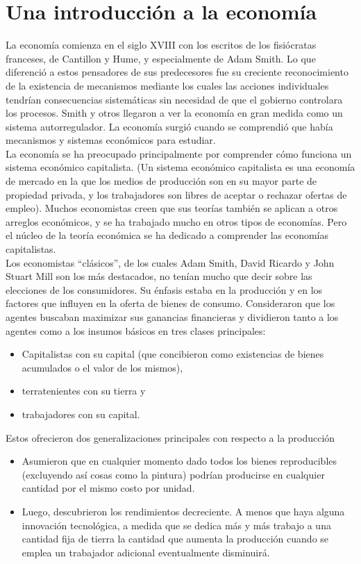 \section{Una introducción a la economía}
La economía comienza en el siglo XVIII con los escritos de los fisiócratas franceses, de Cantillon y Hume, y especialmente de Adam Smith. Lo que diferenció a estos pensadores de sus predecesores fue su creciente reconocimiento de la existencia de mecanismos mediante los cuales las acciones individuales tendrían consecuencias sistemáticas sin necesidad de que el gobierno controlara los procesos. Smith y otros llegaron a ver la economía en gran medida como un sistema autorregulador. La economía surgió cuando se comprendió que había mecanismos y sistemas económicos para estudiar. \\

La economía se ha preocupado principalmente por comprender cómo funciona un sistema económico capitalista. (Un sistema económico capitalista es una economía de mercado en la que los medios de producción son en su mayor parte de propiedad privada, y los trabajadores son libres de aceptar o rechazar ofertas de empleo). Muchos economistas creen que sus teorías también se aplican a otros arreglos económicos, y se ha trabajado mucho en otros tipos de economías. Pero el núcleo de la teoría económica se ha dedicado a comprender las economías capitalistas.\\

 Los economistas “clásicos”, de los cuales Adam Smith, David Ricardo y John Stuart Mill son los más destacados, no tenían mucho que decir sobre las elecciones de los consumidores. Su énfasis estaba en la producción y en los factores que influyen en la oferta de bienes de consumo. Consideraron que los agentes buscaban maximizar sus ganancias financieras y dividieron tanto a los agentes como a los insumos básicos en tres clases principales:
\begin{itemize}
    \item Capitalistas con su capital (que concibieron como existencias de bienes acumulados o el valor de los mismos), 
    \item terratenientes con su tierra y
    \item trabajadores con su capital.
\end{itemize}
Estos ofrecieron dos generalizaciones principales con respecto a la producción
\begin{itemize}
    \item Asumieron que en cualquier momento dado todos los bienes reproducibles (excluyendo así cosas como la pintura) podrían producirse en cualquier cantidad por el mismo costo por unidad.
    \item Luego, descubrieron los rendimientos decreciente. A menos que haya alguna innovación tecnológica, a medida que se dedica más y más trabajo a una cantidad fija de tierra la cantidad que aumenta la producción cuando se emplea un trabajador adicional eventualmente disminuirá.
\end{itemize}

